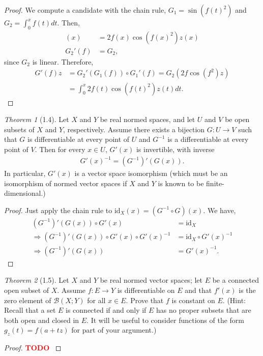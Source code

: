 \documentclass[12pt]{article}
\newcommand{\todo}{\textcolor{red}{\textbf{TODO }}}
\theoremstyle{remark}
\theoremstyle{named}
\newtheorem*{theorem}{Theorem}
\newcommand{\id}[1]{\text{id}_{#1}}
\begin{document}
\begin{proof}
    We compute a candidate with the chain rule, \(G_1 = \sin(f(t)^2)\) and \(G_2 = \int_{0}^{x} f(t) dt\). Then,
    \begin{align*}
        [G_1'(f)z](x) &= 2f(x)\cos(f(x)^2)z(x) \\
        G_2'(f) &= G_2,
    \end{align*}
    since \(G_2\) is linear. Therefore,
    \begin{align*}
        G'(f)z &= G_2'(G_1(f)) \circ G_1'(f) = G_2(2f\cos(f^2)z) \\
        &= \int_{0}^{x} 2 f(t) \cos(f(t)^2) z(t) dt.
    \end{align*}
\end{proof}

\begin{theorem}[1.4]
    Let \(X\) and \(Y\) be real normed spaces, and let \(U\) and \(V\) be open subsets of \(X\) and \(Y\), respectively. Assume there exists a bijection \(G : U \to V\) such that \(G\) is differentiable at every point of \(U\) and \(G^{-1}\) is a differentiable at every point of \(V\). Then for every \(x \in U\), \(G'(x)\) is invertible, with inverse
    \begin{align*}
        G'(x)^{-1} = (G^{-1})'(G(x)).
    \end{align*}
    In particular, \(G'(x)\) is a vector space isomorphism (which must be an isomorphism of normed vector spaces if \(X\) and \(Y\) is known to be finite-dimensional.)
\end{theorem}

\begin{proof}
    Just apply the chain rule to \(\id{X}(x) = (G^{-1} \circ G)(x)\). We have,
    \begin{align*}
        (G^{-1})'(G(x)) \circ G'(x) &= \id{X} \\
        \Rightarrow  (G^{-1})'(G(x)) \circ G'(x) \circ G'(x)^{-1} &= \id{X} \circ G'(x)^{-1} \\
        \Rightarrow (G^{-1})'(G(x)) &= G'(x)^{-1}.
    \end{align*}
\end{proof}

\begin{theorem}[1.5]
    Let \(X\) and \(Y\) be real normed vector spaces; let \(E\) be a connected open subset of \(X\). Assume \(f : E \to Y\) is differentiable on \(E\) and that \(f'(x)\) is the zero element of \(\mathcal B (X;Y)\) for all \(x \in E\). Prove that \(f\) is constant on \(E\). (Hint: Recall that a set \(E\) is connected if and only if \(E\) has no proper subsets that are both open and closed in \(E\). It will be useful to consider functions of the form \(g_z(t) = f(a + tz)\) for part of your argument.)
\end{theorem}

\begin{proof}
    \todo
\end{proof}
\end{document}
